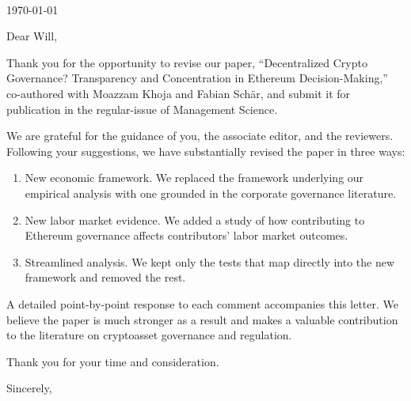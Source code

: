 \documentclass[11pt,a4paper]{letter} %
\def\opening#1{\thispagestyle{empty}
{\centering\fromaddress \vspace{0.6in} \\ %
\today\hspace*{\fill}\par} %
{\raggedright \toname  \toaddress \par} %
\vspace{0.3in} %
\noindent #1 %
}
\begin{document}

\begin{letter}


\opening{Dear Will,}

Thank you for the opportunity to revise our paper, ``Decentralized Crypto Governance? Transparency and Concentration in Ethereum Decision-Making,'' co-authored with Moazzam Khoja and Fabian Sch\"ar, and submit it for publication in the regular-issue of Management Science.

We are grateful for the guidance of you, the associate editor, and the reviewers. Following your suggestions, we have substantially revised the paper in three ways:

\begin{enumerate}[leftmargin=2em, itemsep=0.3em]
  \item New economic framework. We replaced the framework underlying our empirical analysis with one grounded in the corporate governance literature.
  \item New labor market evidence. We added a study of how contributing to Ethereum governance affects contributors' labor market outcomes.
  \item Streamlined analysis. We kept only the tests that map directly into the new framework and removed the rest.
\end{enumerate}

A detailed point-by-point response to each comment accompanies this letter. We believe the paper is much stronger as a result and makes a valuable contribution to the literature on cryptoasset governance and regulation.

Thank you for your time and consideration.


\closing{Sincerely,}


\end{letter}
\end{document}
